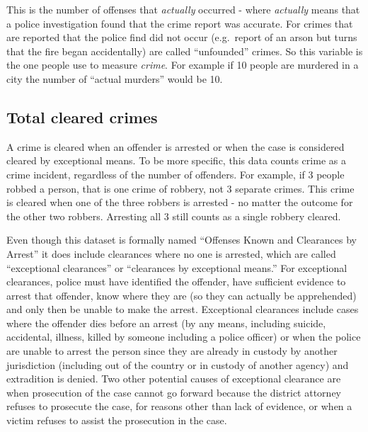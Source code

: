 \documentclass[
  12pt,
  openany]{book}
\begin{document}
This is the number of offenses that \emph{actually} occurred - where \emph{actually} means that a police investigation found that the crime report was accurate. For crimes that are reported that the police find did not occur (e.g.~report of an arson but turns that the fire began accidentally) are called ``unfounded'' crimes. So this variable is the one people use to measure \emph{crime}. For example if 10 people are murdered in a city the number of ``actual murders'' would be 10.

\hypertarget{clearedCrimes}{%
\subsection{Total cleared crimes}\label{clearedCrimes}}

A crime is cleared when an offender is arrested or when the case is considered cleared by exceptional means. To be more specific, this data counts crime as a crime incident, regardless of the number of offenders. For example, if 3 people robbed a person, that is one crime of robbery, not 3 separate crimes. This crime is cleared when one of the three robbers is arrested - no matter the outcome for the other two robbers. Arresting all 3 still counts as a single robbery cleared.

Even though this dataset is formally named ``Offenses Known and Clearances by Arrest'' it does include clearances where no one is arrested, which are called ``exceptional clearances'' or ``clearances by exceptional means.'' For exceptional clearances, police must have identified the offender, have sufficient evidence to arrest that offender, know where they are (so they can actually be apprehended) and only then be unable to make the arrest. Exceptional clearances include cases where the offender dies before an arrest (by any means, including suicide, accidental, illness, killed by someone including a police officer) or when the police are unable to arrest the person since they are already in custody by another jurisdiction (including out of the country or in custody of another agency) and extradition is denied. Two other potential causes of exceptional clearance are when prosecution of the case cannot go forward because the district attorney refuses to prosecute the case, for reasons other than lack of evidence, or when a victim refuses to assist the prosecution in the case.
\end{document}
